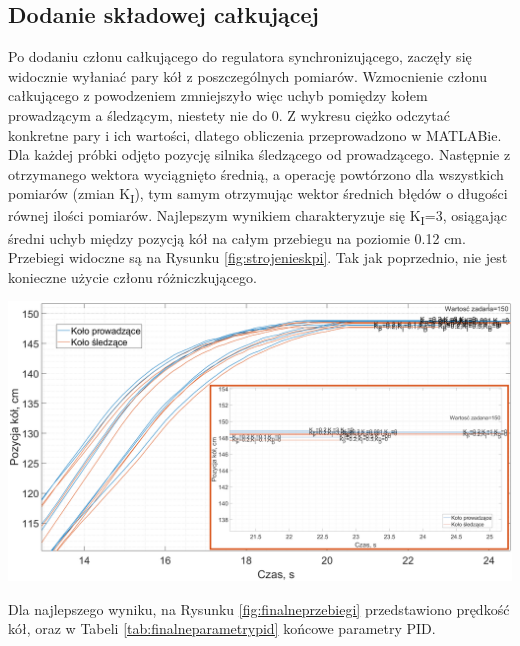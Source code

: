 \subsection*{Dodanie składowej całkującej}
Po dodaniu członu całkującego do regulatora synchronizującego, zaczęły się widocznie wyłaniać pary kół z poszczególnych pomiarów. Wzmocnienie członu całkującego z powodzeniem zmniejszyło więc uchyb pomiędzy kołem prowadzącym a śledzącym, niestety nie do 0. Z wykresu ciężko odczytać konkretne pary i ich wartości, dlatego obliczenia przeprowadzono w MATLABie. Dla każdej próbki odjęto pozycję silnika śledzącego od prowadzącego. Następnie z otrzymanego wektora wyciągnięto średnią, a operację powtórzono dla wszystkich pomiarów (zmian K\textsubscript{I}), tym samym otrzymując wektor średnich błędów o długości równej ilości pomiarów. Najlepszym wynikiem charakteryzuje się K\textsubscript{I}=3, osiągając średni uchyb między pozycją kół na całym przebiegu na poziomie 0.12 cm. Przebiegi widoczne są na Rysunku \ref{fig:strojenieskpi}. Tak jak poprzednio, nie jest konieczne użycie członu różniczkującego.
\begin{center}
    \includegraphics[scale=0.37]{images/strojenieSPI.png}
    \label{fig:strojenieskpi}
\end{center}

Dla najlepszego wyniku, na Rysunku \ref{fig:finalneprzebiegi} przedstawiono prędkość kół, oraz w Tabeli \ref{tab:finalneparametrypid} końcowe parametry PID.

